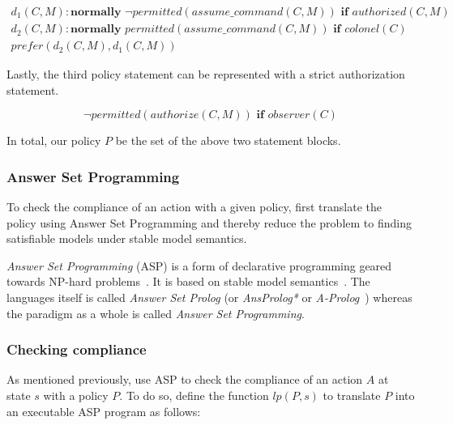 \begin{gather*}
    d_1(C, M): \textbf{normally } \neg permitted(assume\_command(C, M)) \textbf{ if } authorized(C, M) \\
    d_2(C, M): \textbf{normally } permitted(assume\_command(C, M)) \textbf{ if } colonel(C) \\
    prefer(d_2(C,M),d_1(C,M))
\end{gather*}

Lastly, the third policy statement can be represented with a strict authorization statement.

$$
\neg permitted(authorize(C, M)) \textbf{ if } observer(C)
$$

In total, our policy $P$ be the set of the above two statement blocks.

\subsubsection{Answer Set Programming}
\label{subsubsec:asp}

To check the compliance of an action with a given policy, \citet{gelfond_authorization_2008} first translate the policy using Answer Set Programming and thereby reduce the problem to finding satisfiable models under stable model semantics.

\textit{Answer Set Programming} (ASP) is a form of declarative programming geared towards NP-hard problems~\citep{vladimir_lifschitz_what_2008}.
It is based on stable model semantics~\citep{gelfond_stable_1988}.
The languages itself is called \textit{Answer Set Prolog} (or \textit{AnsProlog*} or \textit{A-Prolog}~\citep{baral_answer_2004}) whereas the paradigm as a whole is called \textit{Answer Set Programming}.

\subsubsection{Checking compliance}

As mentioned previously, \citet{gelfond_authorization_2008} use ASP to check the compliance of an action $A$ at state $s$ with a policy $P$.
To do so, \citet{gelfond_authorization_2008} define the function $lp(P,s)$ to translate $P$ into an executable ASP program as follows:

